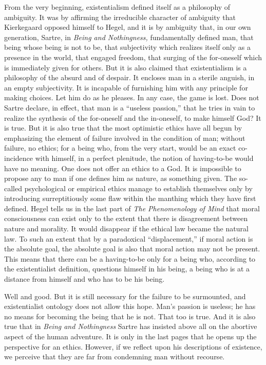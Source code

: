 \documentclass[11pt]{article}
\begin{document}
From the very beginning, existentialism defined itself as a philosophy of ambiguity. It was by affirming the irreducible character of ambiguity that Kierkegaard opposed himself to Hegel, and it is by ambiguity that, in our own generation, Sartre, in \textit{Being and Nothingness,} fundamentally defined man, that being whose being is not to be, that subjectivity which realizes itself only as a presence in the world, that engaged freedom, that surging of the for-oneself which is immediately given for others. But it is also claimed that existentialism is a philosophy of the absurd and of despair. It encloses man in a sterile anguish, in an empty subjectivity. It is incapable of furnishing him with any principle for making choices. Let him do as he pleases. In any case, the game is lost. Does not Sartre declare, in effect, that man is a “useless passion,” that he tries in vain to realize the synthesis of the for-oneself and the in-oneself, to make himself God? It is true. But it is also true that the most optimistic ethics have all begun by emphasizing the element of failure involved in the condition of man; without failure, no ethics; for a being who, from the very start, would be an exact co-incidence with himself, in a perfect plenitude, the notion of having-to-be would have no meaning. One does not offer an ethics to a God. It is impossible to propose any to man if one defines him as nature, as something given. The so-called psychological or empirical ethics manage to establish themselves only by introducing surreptitiously some flaw within the manthing which they have first defined. Hegel tells us in the last part of \textit{The Phenomenology of Mind} that moral consciousness can exist only to the extent that there is disagreement between nature and morality. It would disappear if the ethical law became the natural law. To such an extent that by a paradoxical “displacement,” if moral action is the absolute goal, the absolute goal is also that moral action may not be present. This means that there can be a having-to-be only for a being who, according to the existentialist definition, questions himself in his being, a being who is at a distance from himself and who has to be his being.

Well and good. But it is still necessary for the failure to be surmounted, and existentialist ontology does not allow this hope. Man’s passion is useless; he has no means for becoming the being that he is not. That too is true. And it is also true that in \textit{Being and Nothingness} Sartre has insisted above all on the abortive aspect of the human adventure. It is only in the last pages that he opens up the perspective for an ethics. However, if we reflect upon his descriptions of existence, we perceive that they are far from condemning man without recourse.
\end{document}
